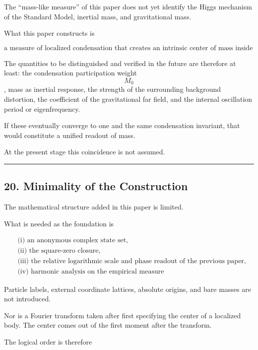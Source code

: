\documentclass[
  a4paper,
]{article}
\begin{document}
The ``mass-like measure'' of this paper does not yet identify the Higgs
mechanism of the Standard Model, inertial mass, and gravitational mass.

What this paper constructs is

\[
\boxed{
\text{a measure of localized condensation that creates an intrinsic center of mass inside the homogeneous vacuum}
}
\]

The quantities to be distinguished and verified in the future are
therefore at least: the condensation participation weight \[M_0\], mass
as inertial response, the strength of the surrounding background
distortion, the coefficient of the gravitational far field, and the
internal oscillation period or eigenfrequency.

If these eventually converge to one and the same condensation invariant,
that would constitute a unified readout of mass.

At the present stage this coincidence is not assumed.

\begin{center}\rule{0.5\linewidth}{0.5pt}\end{center}

\subsection{20. Minimality of the
Construction}\label{minimality-of-the-construction}

The mathematical structure added in this paper is limited.

What is needed as the foundation is

\[
\boxed{
\begin{aligned}
&\text{(i) an anonymous complex state set},\\
&\text{(ii) the square-zero closure},\\
&\text{(iii) the relative logarithmic scale and phase readout of the previous paper},\\
&\text{(iv) harmonic analysis on the empirical measure}
\end{aligned}
}
\]

Particle labels, external coordinate lattices, absolute origins, and
bare masses are not introduced.

Nor is a Fourier transform taken after first specifying the center of a
localized body. The center comes out of the first moment after the
transform.

The logical order is therefore
\end{document}
